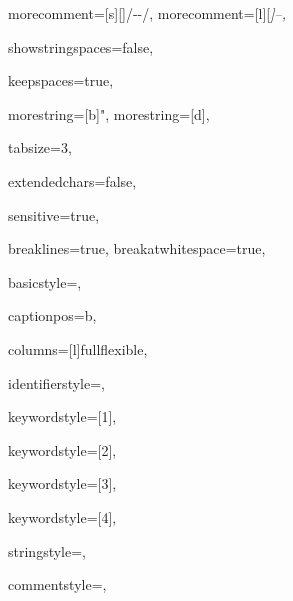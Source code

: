 {%
morecomment=[s][\color{commentcolor}]{/-}{-/},
morecomment=[l][\itshape \color{commentcolor}]{--},

showstringspaces=false,

keepspaces=true,

morestring=[b]",
morestring=[d],

tabsize=3,

extendedchars=false,

sensitive=true,

breaklines=true,
breakatwhitespace=true,

basicstyle=\ttfamily\small,

captionpos=b,

columns=[l]fullflexible,


identifierstyle={\ttfamily\color{black}},

keywordstyle=[1]{\ttfamily\color{keywordcolor}},

keywordstyle=[2]{\ttfamily\color{sortcolor}},

keywordstyle=[3]{\ttfamily\color{tacticcolor}},

keywordstyle=[4]{\ttfamily\color{attributecolor}},

stringstyle=\ttfamily,

commentstyle={\ttfamily\footnotesize },

}
